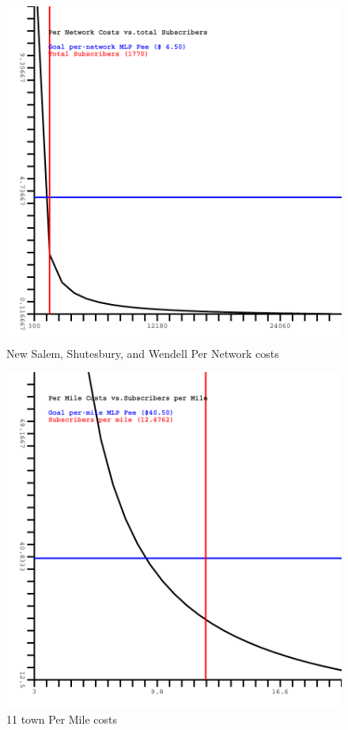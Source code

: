 \documentclass[12pt]{article}
\begin{document}
\begin{figure}[Hpbt]
\begin{centering}
\includegraphics[width=5in]{NEW_SALEM-SHUTESBURY-WENDELL-PerNetwork.pdf}
\caption{New Salem, Shutesbury, and Wendell Per Network costs}
\label{fig:NEWSALEM-SHUTESBURY-WENDELLPN}
\end{centering}
\end{figure}
\begin{figure}[Hptb]
\begin{centering}
\includegraphics[width=5in]{BECKET-GOSHEN-HEATH-NEW_ASHFORD-NEW_SALEM-PLAINFIELD-ROWE-SHUTESBURY-WASHINGTON-WENDELL-WINDSOR-PerMile.pdf}
\caption{11 town Per Mile costs}
\label{fig:BECKET-GOSHEN-HEATHETCPM}
\end{centering}
\end{figure}
\end{document}
